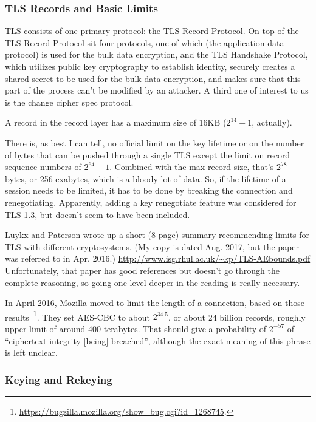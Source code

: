 \subsubsection{TLS Records and Basic Limits}

TLS consists of one primary protocol: the TLS Record Protocol.  On top
of the TLS Record Protocol sit four protocols, one of which (the
application data protocol) is used for the bulk data encryption, and
the TLS Handshake Protocol, which utilizes public key cryptography to
establish identity, securely creates a shared secret to be used for
the bulk data encryption, and makes sure that this part of the process
can't be modified by an attacker.  A third one of interest to us is
the change cipher spec protocol.

A record in the record layer has a maximum size of 16KB ($2^{14}+1$, actually).

There is, as best I can tell, no official limit on the key lifetime or
on the number of bytes that can be pushed through a single TLS except
the limit on record sequence numbers of $2^{64}-1$.  Combined with the
max record size, that's $2^{78}$ bytes, or 256 exabytes, which is a bloody
lot of data.  So, if the lifetime of a session needs to be limited, it
has to be done by breaking the connection and renegotiating.
Apparently, adding a key renegotiate feature was considered for
TLS 1.3, but doesn't seem to have been included.

Luykx and Paterson wrote up a short (8 page) summary recommending
limits for TLS with different cryptosystems. (My copy is dated
Aug. 2017, but the paper was referred to in Apr. 2016.)
\url{http://www.isg.rhul.ac.uk/~kp/TLS-AEbounds.pdf}
Unfortunately, that paper has good references but doesn't go through
the complete reasoning, so going one level deeper in the reading is
really necessary.

In April 2016, Mozilla moved to limit the length of a connection,
based on those
results~\footnote{\url{https://bugzilla.mozilla.org/show_bug.cgi?id=1268745}.}.
They set AES-CBC to about $2^{34.5}$, or about 24 billion records,
roughly upper limit of around 400 terabytes.  That should give a
probability of $2^{-57}$ of ``ciphertext integrity [being] breached'',
although the exact meaning of this phrase is left unclear.

\subsubsection{Keying and Rekeying}
\label{sec:tls-rekeying}

